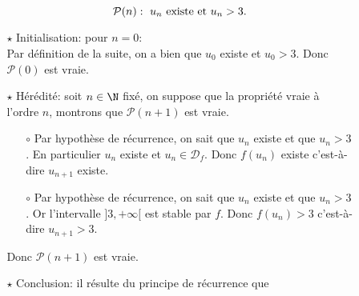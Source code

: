 \documentclass[a4paper, 11pt]{article}
\begin{document}
\begin{correction}
\begin{enumerate}
\begin{enumerate}
\begin{itemize}
$$\mathcal{P}(n):\ u_n\ \hbox{existe et}\ u_n>3.$$
\item[$\star$] Initialisation: pour $n=0$:\\
\noindent Par d\'efinition de la suite, on a bien que $u_0$ existe et $u_0>3$. Donc $\mathcal{P}(0)$ est vraie.
\item[$\star$] H\'er\'edit\'e: soit $n\in\N$ fix\'e, on suppose que la propri\'et\'e vraie \`{a} l'ordre $n$, montrons que $\mathcal{P}(n+1)$ est vraie.
\begin{itemize}
\item[$\circ$] Par hypoth\`{e}se de r\'ecurrence, on sait que $u_n$ existe et que $u_n>3$. En particulier $u_n$ existe et $u_n\in\mathcal{D}_f$. Donc $f(u_n)$ existe c'est-\`{a}-dire $u_{n+1}$ existe.
\item[$\circ$] Par hypoth\`{e}se de r\'ecurrence, on sait que $u_n$ existe et que $u_n>3$. Or l'intervalle $\rbrack 3,+\infty\lbrack$ est stable par $f$. Donc $f(u_n)>3$ c'est-\`{a}-dire $u_{n+1}>3$.
\end{itemize}
Donc $\mathcal{P}(n+1)$ est vraie.
\item[$\star$] Conclusion: il r\'esulte du principe de r\'ecurrence que


\end{itemize}
\end{enumerate}
\end{enumerate}
\end{correction}
\end{document}
